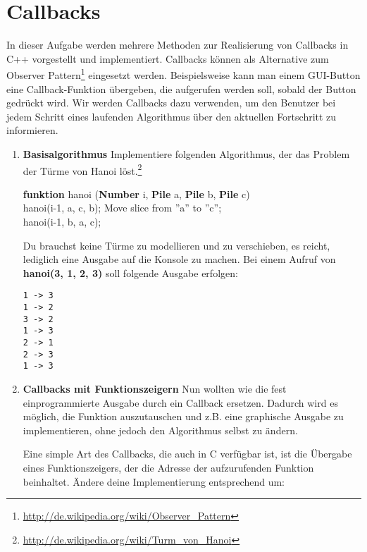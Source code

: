 \documentclass[
  accentcolor=tud1c,	%
  colorbacktitle,		%
  inverttitle,			%
  german,				%
  twoside
]{tudexercise}
\begin{document}
\section{Callbacks}
In dieser Aufgabe werden mehrere Methoden zur Realisierung von Callbacks in C++ vorgestellt und implementiert. 
Callbacks können als Alternative zum Observer Pattern\footnote{\url{http://de.wikipedia.org/wiki/Observer_Pattern}} eingesetzt werden.
Beispielsweise kann man einem GUI-Button eine Callback-Funktion übergeben, die aufgerufen werden soll, sobald der Button gedrückt wird.
Wir werden Callbacks dazu verwenden, um den Benutzer bei jedem Schritt eines laufenden Algorithmus über den aktuellen Fortschritt zu informieren.

\begin{enumerate}

\item \textbf{Basisalgorithmus}
Implementiere folgenden Algorithmus, der das Problem der Türme von Hanoi löst.\footnote{\url{http://de.wikipedia.org/wiki/Turm_von_Hanoi}} \\
\begin{algorithm}[H]
 \SetAlgoLined
 \textbf{funktion} hanoi (\textbf{Number} i, \textbf{Pile} a, \textbf{Pile} b, \textbf{Pile} c) { \\
      {
        hanoi(i-1, a, c, b); 
        Move slice from ''a'' to ''c''; \\
        hanoi(i-1, b, a, c); 
     }
 }
\end{algorithm}

Du brauchst keine Türme zu modellieren und zu verschieben, es reicht, lediglich eine Ausgabe auf die Konsole zu machen. Bei einem Aufruf von \textbf{hanoi(3, 1, 2, 3)} soll folgende Ausgabe erfolgen:
\begin{lstlisting}
1 -> 3
1 -> 2
3 -> 2
1 -> 3
2 -> 1
2 -> 3
1 -> 3
\end{lstlisting}

\item \textbf{Callbacks mit Funktionszeigern}
Nun wollten wie die fest einprogrammierte Ausgabe durch ein Callback ersetzen. Dadurch wird es möglich, die Funktion auszutauschen und z.B. eine graphische Ausgabe zu implementieren, ohne jedoch den Algorithmus selbst zu ändern.

Eine simple Art des Callbacks, die auch in C verfügbar ist, ist die Übergabe eines Funktionszeigers, der die Adresse der aufzurufenden Funktion beinhaltet.
Ändere deine Implementierung entsprechend um:


\end{enumerate}
\end{document}
